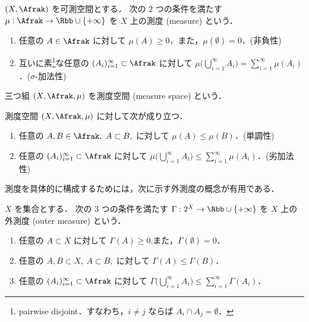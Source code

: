 \begin{definition}
    $(X,\Afrak)$ を可測空間とする．
    次の $2$ つの条件を満たす $\mu:\Afrak\to\Rbb\cup\{+\infty\}$ を $X$ 上の測度 (measure) という．
    \begin{enumerate}[label=\textsf{(M\arabic*)},align=left]
        \item\label{item:m1} 任意の $A\in\Afrak$ に対して $\mu(A)\ge0$．また，$\mu(\emptyset)=0$．\qquad (非負性)
        \item\label{item:m2} 互いに素\footnote{pairwise disjoint．すなわち，$i\ne j$ ならば $A_i\cap A_j=\emptyset$．}な任意の $(A_i)_{i=1}^\infty\subset\Afrak$ に対して
            $\displaystyle\mu\biggl(\bigcup_{i=1}^\infty A_i\biggr)=\sum_{i=1}^\infty\mu(A_i)$．\qquad ($\sigma$-加法性)
    \end{enumerate}
    三つ組 $(X,\Afrak,\mu)$ を測度空間 (measure space) という．
\end{definition}

\begin{remark}
    測度空間 $(X,\Afrak,\mu)$ に対して次が成り立つ．
    \begin{enumerate}
        \item 任意の $A,B\in\Afrak,\ A\subset B,$ に対して $\mu(A)\le\mu(B)$．\qquad(単調性)
        \item 任意の $(A_i)_{i=1}^\infty\subset\Afrak$ に対して $\displaystyle\mu\biggl(\bigcup_{i=1}^\infty A_i\biggr)\le\sum_{i=1}^\infty\mu(A_i)$．\qquad(劣加法性)
    \end{enumerate}
\end{remark}

測度を具体的に構成するためには，次に示す外測度の概念が有用である．

\begin{definition}
    $X$ を集合とする．
    次の $3$ つの条件を満たす $\Gamma:2^X\to\Rbb\cup\{+\infty\}$ を $X$ 上の外測度 (outer measure) という．
    \begin{enumerate}[label=\textsf{(OM\arabic*)},align=left]
        \item\label{item:om1} 任意の $A\subset X$ に対して $\Gamma(A)\ge0$.また，$\Gamma(\emptyset)=0$．
        \item\label{item:om2} 任意の $A,B\subset X,\ A\subset B,$ に対して $\Gamma(A)\le\Gamma(B)$．
        \item\label{item:om3} 任意の $(A_i)_{i=1}^\infty\subset\Afrak$ に対して $\displaystyle\Gamma\biggl(\bigcup_{i=1}^\infty A_i\biggr)\le\sum_{i=1}^\infty\Gamma(A_i)$．
    \end{enumerate}
\end{definition}

